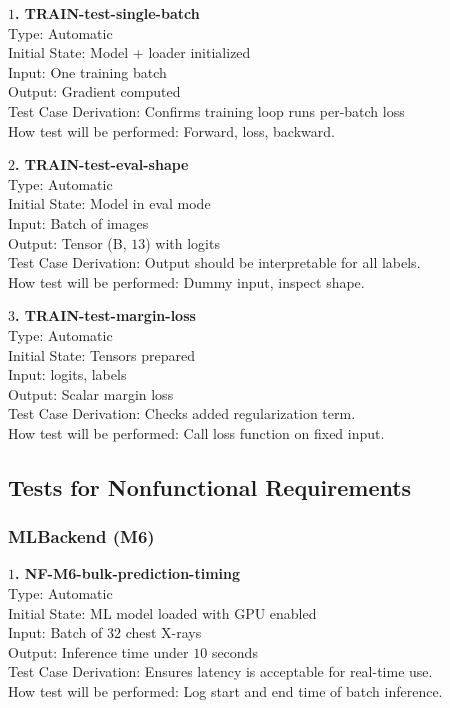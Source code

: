 \documentclass[12pt, titlepage]{article}
\begin{document}
\textbf{$1$. TRAIN-test-single-batch}\\
Type: Automatic\\
Initial State: Model + loader initialized\\
Input: One training batch\\
Output: Gradient computed\\
Test Case Derivation: Confirms training loop runs per-batch loss\\
How test will be performed: Forward, loss, backward.

\textbf{$2$. TRAIN-test-eval-shape}\\
Type: Automatic\\
Initial State: Model in eval mode\\
Input: Batch of images\\
Output: Tensor (B, $13$) with logits\\
Test Case Derivation: Output should be interpretable for all labels.\\
How test will be performed: Dummy input, inspect shape.

\textbf{$3$. TRAIN-test-margin-loss}\\
Type: Automatic\\
Initial State: Tensors prepared\\
Input: logits, labels\\
Output: Scalar margin loss\\
Test Case Derivation: Checks added regularization term.\\
How test will be performed: Call loss function on fixed input.




\subsection{Tests for Nonfunctional Requirements}

\subsubsection{MLBackend (M6)}

\textbf{$1$. NF-M6-bulk-prediction-timing}\\
Type: Automatic\\
Initial State: ML model loaded with GPU enabled\\
Input: Batch of $32$ chest X-rays\\
Output: Inference time under $10$ seconds\\
Test Case Derivation: Ensures latency is acceptable for real-time use.\\
How test will be performed: Log start and end time of batch inference.
\end{document}
